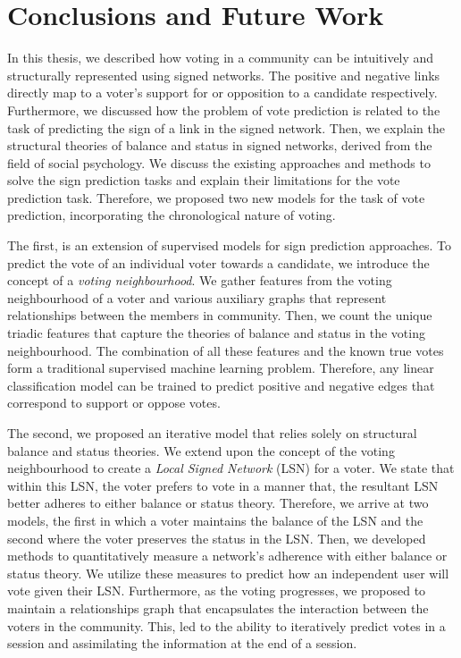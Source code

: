 \chapter{Conclusions and Future Work}
\label{chp:conclusion}
In this thesis, we described how voting in a community can be intuitively and structurally represented using signed networks.
The positive and negative links directly map to a voter's support for or opposition to a candidate respectively.
Furthermore, we discussed how the problem of vote prediction is related to the task of predicting the sign of a link in the signed network.
Then, we explain the structural theories of balance and status in signed networks, derived from the field of social psychology.
We discuss the existing approaches and methods to solve the sign prediction tasks and explain their limitations for the vote prediction task.
Therefore, we proposed two new models for the task of vote prediction, incorporating the chronological nature of voting.

The first, is an extension of supervised models for sign prediction approaches.
To predict the vote of an individual voter towards a candidate, we introduce the concept of a \textit{voting neighbourhood}.
We gather features from the voting neighbourhood of a voter and various auxiliary graphs that represent relationships between the members in community.
Then, we count the unique triadic features that capture the theories of balance and status in the voting neighbourhood.
The combination of all these features and the known true votes form a traditional supervised machine learning problem.
Therefore, any linear classification model can be trained to predict positive and negative edges that correspond to support or oppose votes.

The second, we proposed an iterative model that relies solely on structural balance and status theories.
We extend upon the concept of the voting neighbourhood to create a \textit{Local Signed Network} (LSN) for a voter.
We state that within this LSN, the voter prefers to vote in a manner that, the resultant LSN better adheres to either balance or status theory.
Therefore, we arrive at two models, the first in which a voter maintains the balance of the LSN and the second where the voter preserves the status in the LSN.
Then, we developed methods to quantitatively measure a network's adherence with either balance or status theory.
We utilize these measures to predict how an independent user will vote given their LSN.
Furthermore, as the voting progresses, we proposed to maintain a relationships graph that encapsulates the interaction between the voters in the community.
This, led to the ability to iteratively predict votes in a session and assimilating the information at the end of a session.

